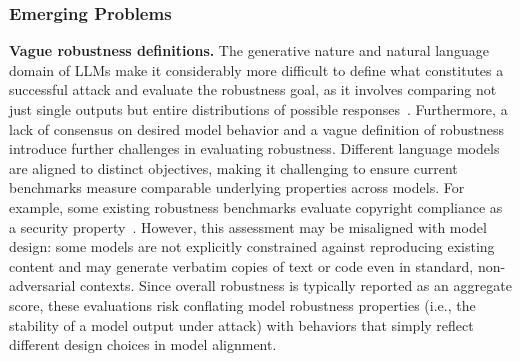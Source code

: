 \subsubsection{Emerging Problems}\label{sec:goal-amplified}



\textbf{Vague robustness definitions.} The generative nature and natural language domain of LLMs make it considerably more difficult to define what constitutes a successful attack and evaluate the robustness goal, as it involves comparing not just single outputs but entire distributions of possible responses~\cite{scholten2025a}. Furthermore, a lack of consensus on desired model behavior and a vague definition of robustness introduce further challenges in evaluating robustness. Different language models are aligned to distinct objectives, making it challenging to ensure current benchmarks measure comparable underlying properties across models. For example, some existing robustness benchmarks evaluate copyright compliance as a security property~\cite{mazeika2024harmbench}. However, this assessment may be misaligned with model design: some models are not explicitly constrained against reproducing existing content and may generate verbatim copies of text or code even in standard, non-adversarial contexts. Since overall robustness is typically reported as an aggregate score, these evaluations risk conflating model robustness properties (i.e., the stability of a model output under attack) with behaviors that simply reflect different design choices in model alignment. %


